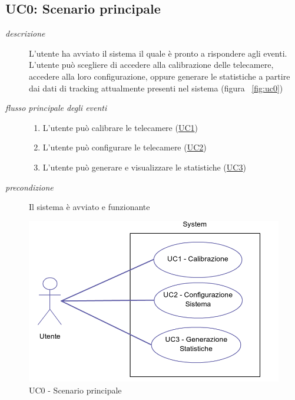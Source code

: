 \subsection{UC0: Scenario principale} \label{sec:UC0}
\begin{description}
\item[\em{descrizione }]L'utente ha avviato il sistema il quale è pronto a rispondere agli eventi. L'utente può scegliere di accedere alla calibrazione delle telecamere, accedere alla loro configurazione, oppure generare le statistiche a partire dai dati di tracking attualmente presenti nel sistema (figura ~\ref{fig:uc0})
\item[\em{flusso principale degli eventi }] \mbox{}
\begin{enumerate}
\item L'utente può calibrare le telecamere (\hyperref[sec:uc1]{UC1}) 
\item L'utente può configurare le telecamere (\hyperref[sec:uc2]{UC2})
\item L'utente può generare e visualizzare le statistiche (\hyperref[sec:uc3]{UC3})
\end{enumerate}
\item[\em{precondizione }] Il sistema è avviato e funzionante
\end{description}

\begin{figure}[htpb] 
\centering 
\includegraphics[scale=0.4]{./images/uc0.png} 
\caption{UC0 - Scenario principale} 
\label{fig:UC0}
\end{figure} 

